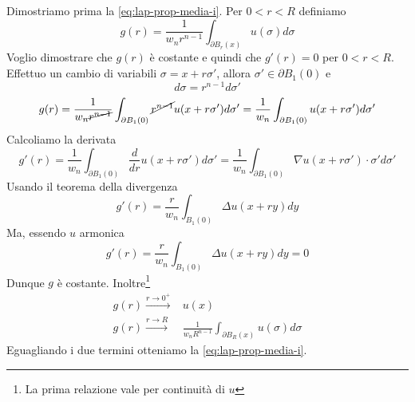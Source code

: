 \documentclass[10pt,a4paper,twoside,openright]{book}
\begin{document}
\begin{dimostrazione}
	Dimostriamo prima la \eqref{eq:lap-prop-media-i}. Per $\displaystyle 0< r< R$ definiamo
	\begin{equation*}
		g(r) =\frac{1}{w_{n} r^{n-1}}\int _{\partial B_{r}(x)} u(\sigma) d\sigma 
	\end{equation*}
	Voglio dimostrare che $\displaystyle g(r)$ è costante e quindi che $\displaystyle g'(r) =0$ per $\displaystyle 0< r< R$. Effettuo un cambio di variabili $\displaystyle \sigma =x+r\sigma '$, allora $\displaystyle \sigma '\in \partial B_{1}(0)$ e
	\begin{equation*}
		d\sigma =r^{n-1} d\sigma '
	\end{equation*}
	\begin{equation*}
		g(r) =\frac{1}{w_{n}\cancel{r^{n-1}}}\int _{\partial B_{1}(0)}\cancel{r^{n-1}} u(x+r\sigma ') d\sigma '=\frac{1}{w_{n}}\int _{\partial B_{1}(0)} u(x+r\sigma ') d\sigma '
	\end{equation*}
	Calcoliamo la derivata
	\begin{equation*}
		g'(r) =\frac{1}{w_{n}}\int _{\partial B_{1}(0)}\frac{d}{dr} u(x+r\sigma ') d\sigma '=\frac{1}{w_{n}}\int _{\partial B_{1}(0)} \nabla u(x+r\sigma ') \cdotp \sigma 'd\sigma '
	\end{equation*}
	Usando il teorema della divergenza
	\begin{equation*}
		g'(r) =\frac{r}{w_{n}}\int _{B_{1}(0)} \Delta u(x+ry) dy
	\end{equation*}
	Ma, essendo $\displaystyle u$ armonica
	\begin{equation*}
		g'(r) =\frac{r}{w_{n}}\int _{B_{1}(0)} \Delta u(x+ry) dy=0
	\end{equation*}
	Dunque $\displaystyle g$ è costante. Inoltre\footnote{La prima relazione vale per continuità di $\displaystyle u$}
	\begin{align*}
		g(r)\xrightarrow{r\rightarrow 0^{+}} & u(x)                                                                 \\
		g(r)\xrightarrow{r\rightarrow R}     & \frac{1}{w_{n} R^{n-1}}\int _{\partial B_{R}(x)} u(\sigma) d\sigma 
	\end{align*}
	Eguagliando i due termini otteniamo la \eqref{eq:lap-prop-media-i}.
	

\end{dimostrazione}
\end{document}
